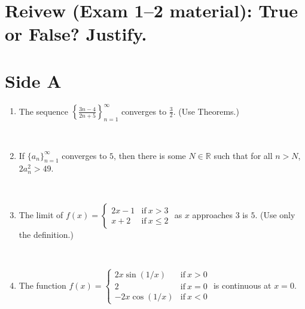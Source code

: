 \documentclass[12pt]{amsart}
\newcommand{\R}{{\mathbb{R}}}
\numberwithin{equation}{section}
\theoremstyle{plain} %
\theoremstyle{definition}
\theoremstyle{remark}
\newcommand{\ds}{\displaystyle}
\begin{document}
\thispagestyle{empty}
\pagestyle{empty}

\section*{\large Reivew (Exam 1--2 material): True or False? Justify.}

\section*{Side A}









\begin{enumerate}





\item The sequence $\ds \left\{ \frac{3n-4}{2n+5}\right\}_{n=1}^\infty$ converges to $\frac{3}{2}$. (Use Theorems.)

\



\item If $\{a_n\}_{n=1}^\infty$ converges to $5$, then there is some $N\in \R$ such that for all $n>N$, $2a_n^2 > 49$.

\





 \item The limit of $f(x)=\begin{cases} 2x-1 & \text{if} \ x>3 \\ x+2 & \text{if} \ x\leq 2 \end{cases}$ as $x$ approaches $3$ is $5$. (Use only the definition.)

\



\item The function $f(x) = \begin{cases} 2x \sin(1/x)  & \text{if} \ x>0 \\ 
2 & \text{if} \ x=0 \\ -2x \cos(1/x)  & \text{if} \ x<0\end{cases}$ is continuous at $x=0$.


\end{enumerate}
\end{document}

